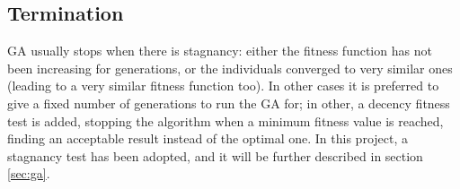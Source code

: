 \subsection{Termination} 
GA usually stops when there is stagnancy: either the fitness function has not been increasing for generations, or the individuals converged to very similar ones (leading to a very similar fitness function too). In other cases it is preferred to give a fixed number of generations to run the GA for; in other, a decency fitness test is added, stopping the algorithm when a minimum fitness value is reached, finding an acceptable result instead of the optimal one. In this project, a stagnancy test has been adopted, and it will be further described in section \ref{sec:ga}.
